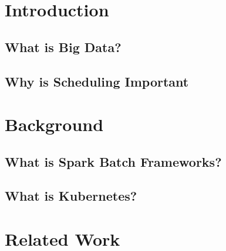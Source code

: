 



\newcommand{\titleLineOne}{Implentation of an simplistic Interface for}
\newcommand{\titleLineTwo}{  Big Data Workload Scheduler in Kubernetes}
\newcommand{\titleLineThree}{}
\newcommand{\documentdate}{December 22, 2015}
\newcommand{\studentname}{Lukas Schwerdtfeger}
\newcommand{\abstracttextde}{Kurze Zusammenfassung der Arbeit in 250 W\"ortern.}
\newcommand{\abstracttext}{Short version of the thesis in 250 words.}
\newcommand{\acktext}{This chapter is optional. First of all, I would like to...}
\providecommand{\tightlist}{%
  \setlength{\itemsep}{0pt}\setlength{\parskip}{0pt}}


 




\chapter{Introduction}

\section{What is Big Data?}

\section{Why is Scheduling Important}


\chapter{Background}

\section{What is Spark Batch Frameworks?}

\section{What is Kubernetes?}


\chapter{Related Work}

